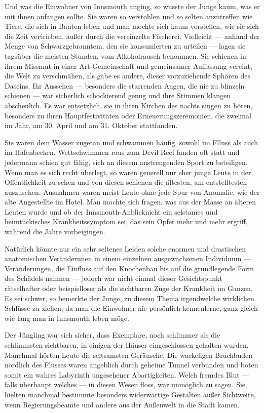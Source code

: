 Und was die Einwohner von Innsmouth anging, so wusste der Junge kaum, was er mit ihnen anfangen sollte. Sie waren so verstohlen und so selten anzutreffen wie Tiere, die sich in Bauten leben und man mochte sich kaum vorstellen, wie sie sich die Zeit vertrieben, außer durch die vereinzelte Fischerei. Vielleicht --- anhand der Menge von Schwarzgebranntem, den sie konsumierten zu urteilen --- lagen sie tagsüber die meisten Stunden, vom Alkoholrausch benommen. Sie schienen in ihrem Missmut in einer Art Gemeinschaft und gemeinsamer Auffassung vereint, die Welt zu verschmähen, als gäbe es andere, dieser vorzuziehende Sphären des Daseins. Ihr Aussehen --- besonders die starrenden Augen, die nie zu blinzeln schienen --- war sicherlich schockierend genug und ihre Stimmen klangen abscheulich. Es war entsetzlich, sie in ihren Kirchen des nachts singen zu hören, besonders zu ihren Hauptfestivitäten oder Erneuerungszeremonien, die zweimal im Jahr, am 30. April und am 31. Oktober stattfanden.

Sie waren dem Wasser zugetan und schwammen häufig, sowohl im Flluss als auch im Hafenbecken. Wettschwimmen raus zum Devil Reef fanden oft statt und jedermann schien gut fähig, sich an diesem anstrengenden Sport zu beteiligen. Wenn man es sich recht überlegt, so waren generell nur eher junge Leute in der Öffentlichkeit zu sehen und von diesen schienen die ältesten, am entstelltesten auszusehen. Ausnahmen waren meist Leute ohne jede Spur von Anomalie, wie der alte Angestellte im Hotel. Man mochte sich fragen, was aus der Masse an älteren Leuten wurde und ob der \glqq Innsmouth-Anblick\grqq nicht ein selstames und heimtückisches Krankheitssymptom sei, das sein Opfer mehr und mehr ergriff, während die Jahre vorbeigingen.

Natürlich könnte nur ein sehr seltenes Leiden solche enormen und drastischen anatomischen Veränderunen in einem einzelnen ausgewachsenen Individuum --- Veränderungen, die Einfluss auf den Knochenbau bis auf die grundlegende Form des Schädels nahmen --- jedoch war nicht einmal dieser Gesichtspunkt rätselhafter oder beispielloser als die sichtbaren Züge der Krankheit im Ganzen. Es sei schwer, so bemerkte der Junge, zu diesem Thema irgendwelche wirklichen Schlüsse zu ziehen, da man die Einwohner nie persönlich kennenlerne, ganz gleich wie lang man in Innsmouth leben möge.

Der Jüngling war sich sicher, dass Exemplare, noch schlimmer als die schlimmsten sichtbaren, in einigen der  Häuser eingeschlossen gehalten wurden. Manchmal hörten Leute die seltsamsten Geräusche. Die wackeligen  Bruchbuden nördlich des Flusses waren angeblich durch geheime Tunnel verbunden und boten somit ein wahres Labyrinth ungesehener Abartigkeiten. Welch fremdes Blut --- falls überhaupt welches --- in diesen Wesen floss, war unmöglich zu sagen. Sie hielten manchmal bestimmte besonders widerwärtige Gestalten außer Sichtweite, wenn Regierungsbeamte und andere aus der Außenwelt in die Stadt kamen.

